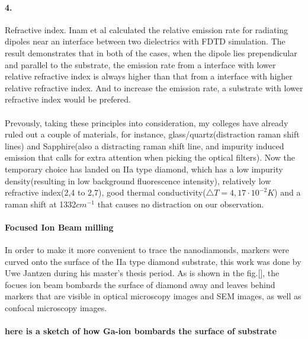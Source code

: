 \paragraph{4.}Refractive index. Inam et al calculated the relative emission rate for radiating dipoles near an interface between two dielectrics with FDTD simulation. The result demonstrates that in both of the cases, when the dipole lies prependicular and parallel to the substrate, the emission rate from a interface with lower relative refractive index is always higher than that from a interface with higher relative refractive index. And to increase the emission rate, a substrate with lower refractive index would be prefered.
\paragraph{}Prevously, taking these principles into consideration, my colleges have already ruled out a couple of materials, for instance, glass/quartz(distraction raman shift lines) and Sapphire(also a distracting raman shift line, and impurity induced emission that calls for extra attention when picking the optical filters). Now the temporary choice has landed on IIa type diamond, which has a low impurity density(resulting in low background fluorescence intensity), relatively low refractive index(2,4 to 2,7), good thermal conductivity($\bigtriangleup T = 4,17 \cdot 10^{-2}K$) and a raman shift at 1332$cm^{-1} $ that causes no distraction on our observation.

\paragraph{Focused Ion Beam milling}
In order to make it more convenient to trace the nanodiamonds, markers were curved onto the surface of the IIa type diamond substrate, this work was done by Uwe Jantzen during his master's thesis period. As is shown in the fig.[], the focues ion beam bombards the surface of diamond away and leaves behind markers that are visible in optical microscopy images and SEM images, as well as confocal microscopy images.
\paragraph{here is a sketch of how Ga-ion bombards the surface of substrate}
